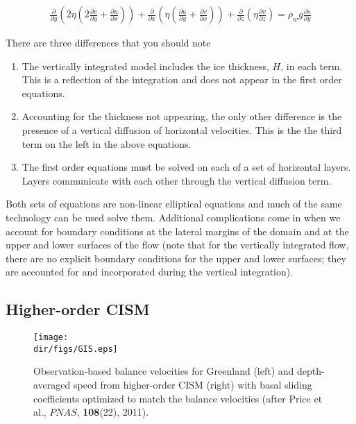 \begin{align*}
\frac{\partial}{\partial y}\left ( 2 \eta 
\left(2\frac{\partial v}{\partial y}+\frac{\partial u}{\partial x}\right)\right)
+\frac{\partial}{\partial x}\left(\eta \left(
\frac{\partial u}{\partial y}+\frac{\partial v}{\partial x}\right)\right)
+\frac{\partial}{\partial z}\left(\eta \frac{\partial v}{\partial z}\right)
=\rho_w g \frac{\partial s}{\partial y}
\end{align*}

There are three differences that you should note
\begin{enumerate}
\item  The vertically integrated model includes the ice thickness, $H$, in each term. This is a reflection of the integration and does not appear in the first order equations.
\item  Accounting for the thickness not appearing, the only other difference is the presence of a vertical diffusion of horizontal velocities. This is the the third term on the left in the above equations.
\item  The first order equations must be solved on each of a set of horizontal layers. Layers communicate with each other through the vertical diffusion term.
\end{enumerate}

Both sets of equations are non-linear elliptical equations and much of the same technology can be used solve them. Additional complications come in when we account for boundary conditions at the lateral margins of the domain and at the upper and lower surfaces of the flow (note that for the vertically integrated flow, there are no explicit boundary conditions for the upper and lower surfaces; they are accounted for and incorporated during the vertical integration).

\subsection{Higher-order CISM}

\begin{figure}
  \begin{center}
    \texttt{[image: \\dir/figs/GIS.eps]}
   \end{center}
  \caption{Observation-based balance velocities for Greenland (left) and depth-averaged speed from higher-order CISM (right) with basal sliding coefficients optimized to match the balance velocities (after Price et al., $PNAS$, \textbf{108}(22), 2011).}
  \label{fig:GIS_PNAS}
\end{figure} 

